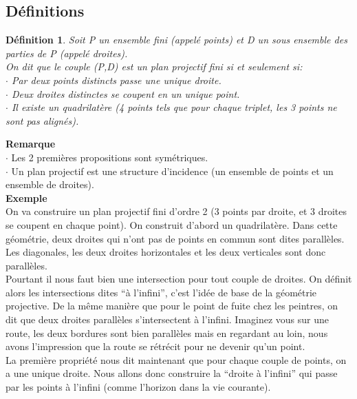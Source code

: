 \documentclass[a4paper]{article}
\newtheorem{Def}{Définition}[section]
\begin{document}
\subsection{Définitions}
\begin{Def}
Soit P un ensemble fini (appelé points) et D un sous ensemble des parties de P (appelé droites). \\
On dit que le couple (P,D) est un plan projectif fini si et seulement si: \\
$\cdot$ Par deux points distincts passe une unique droite. \\
$\cdot$ Deux droites distinctes se coupent en un unique point. \\
$\cdot$ Il existe un quadrilatère (4 points tels que pour chaque triplet, les 3 points ne sont pas alignés).
\end{Def}
\textbf{Remarque}\\
  $\cdot$ Les 2 premières propositions sont symétriques. \\
$\cdot$ Un plan projectif est une structure d'incidence (un ensemble de points et un ensemble de droites).\vspace{1\baselineskip}\\
\textbf{Exemple}\\
On va construire un plan projectif fini d'ordre 2 (3 points par droite, et 3 droites se coupent en chaque point). On construit d'abord un quadrilatère. Dans cette géométrie, deux droites qui n'ont pas de points en commun sont dites parallèles. Les diagonales, les deux droites horizontales et les deux verticales \vspace{1\baselineskip}sont donc parallèles.\\
  Pourtant il nous faut bien une intersection pour tout couple de droites. On définit alors les intersections dites ``à l'infini'', c'est l'idée de base de la géométrie projective. De la même manière que pour le point de fuite chez les peintres, on dit que deux droites parallèles s'intersectent à l'infini. Imaginez vous sur une route, les deux bordures sont bien parallèles mais en regardant au loin, nous avons l'impression que la route se rétrécit pour ne devenir\vspace{1\baselineskip} qu'un point.\\
La première propriété nous dit maintenant que pour chaque couple de points, on a une unique droite. Nous allons donc construire la ``droite à l'infini'' qui passe par les points à l'infini (comme l'horizon dans la vie courante).
\end{document}
